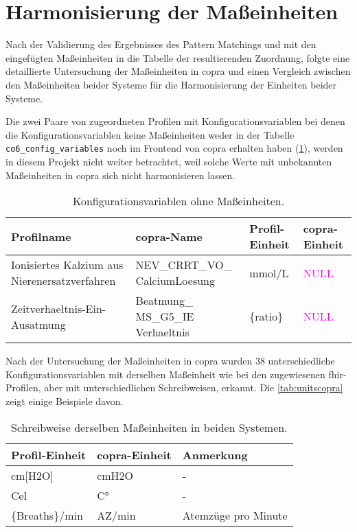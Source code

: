 \section{Harmonisierung der Maßeinheiten} \label{sec:unitscopra}

Nach der Validierung des Ergebnisses des Pattern Matchings und mit den eingefügten Maßeinheiten in die Tabelle der resultierenden Zuordnung, folgte eine detaillierte Untersuchung der Maßeinheiten in \ac{copra} und einen Vergleich zwischen den Maßeinheiten beider Systeme für die Harmonisierung der Einheiten beider Systeme.

Die zwei Paare von zugeordneten Profilen mit Konfigurationsvariablen bei denen die Konfigurationsvariablen keine Maßeinheiten weder in der Tabelle \texttt{co6\_config\_variables} noch im Frontend von \ac{copra} erhalten haben (\ref{tab:nounitscopra}), werden in diesem Projekt nicht weiter betrachtet, weil solche Werte mit unbekannten Maßeinheiten in \ac{copra} sich nicht harmonisieren lassen.

\begin{table}[ht]
	\centering
	\caption[Konfigurationsvariablen ohne Maßeinheiten]{Konfigurationsvariablen ohne Maßeinheiten.}
	\label{tab:nounitscopra}
	\begin{tabular}{|p{3cm}|p{3cm}|l|l|} \hline
		\bfseries Profilname & \bfseries \ac{copra}-Name & \bfseries Profil-Einheit &  \bfseries \ac{copra}-Einheit \\ \hline
		Ionisiertes Kalzium aus Nierenersatzverfahren & NEV\_CRRT\_VO\_ CalciumLoesung & mmol/L & \textcolor{magenta}{NULL} \\ \hline
		Zeitverhaeltnis-Ein-Ausatmung & Beatmung\_ MS\_G5\_IE Verhaeltnis & \{ratio\}  & \textcolor{magenta}{NULL} \\ \hline		
	\end{tabular}
\end{table}

 Nach der Untersuchung der Maßeinheiten in \ac{copra} wurden 38 unterschiedliche Konfigurationsvariablen mit derselben Maßeinheit wie bei den zugewiesenen \ac{fhir}-Profilen, aber mit unterschiedlichen Schreibweisen, erkannt. Die \ref{tab:unitscopra} zeigt einige Beispiele davon.

\clearpage

\begin{table}[ht]
	\centering
	\caption[Schreibweisen derselben Maßeinheiten in beiden Systemen]{Schreibweise derselben Maßeinheiten in beiden Systemen.}
	\label{tab:unitscomii}
	\begin{tabular}{|l|l|l|} \hline
		\bfseries Profil-Einheit & \bfseries \ac{copra}-Einheit & \bfseries Anmerkung \\ \hline
		cm[H2O] & cmH2O & - \\ \hline
		Cel & C° & - \\ \hline
		\{Breaths\}/min & AZ/min & Atemzüge pro Minute \\ \hline
	\end{tabular}
\end{table}

